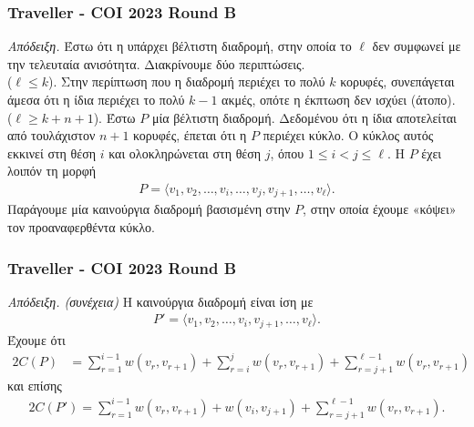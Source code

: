 \documentclass[t]{beamer}
\begin{document}
\begin{frame}
	\frametitle{Traveller - COI 2023 Round B}
	\begin{block}{\emph{Απόδειξη.}}
		Έστω ότι η υπάρχει βέλτιστη διαδρομή, στην οποία το $\ell$ δεν συμφωνεί με την τελευταία ανισότητα. Διακρίνουμε δύο περιπτώσεις.
		\pause
		\\
		\vspace{0.25cm} 		 
		($\ell \leq k$). Στην περίπτωση που η διαδρομή περιέχει το πολύ $k$ κορυφές, συνεπάγεται άμεσα ότι η ίδια περιέχει το πολύ $k - 1$ ακμές, οπότε η έκπτωση δεν ισχύει (άτοπο). 
		\pause
		\\
		\vspace{0.25cm} 	
		($\ell \geq k + n + 1$). Έστω $P$ μία βέλτιστη διαδρομή. Δεδομένου ότι η ίδια αποτελείται από τουλάχιστον $n + 1$ κορυφές, έπεται ότι η $P$ περιέχει κύκλο. Ο κύκλος αυτός εκκινεί στη θέση 
		$i$ και ολοκληρώνεται στη θέση $j$, όπου $1 \leq i < j \leq \ell$. Η $P$ έχει λοιπόν τη μορφή
		\begin{align*}
			P = \langle v_1, v_2, \dots, v_i, \dots, v_j, v_{j + 1}, \dots, v_\ell \rangle.
		\end{align*}
		Παράγουμε μία καινούργια διαδρομή βασισμένη στην $P$, στην οποία έχουμε «κόψει» τον προαναφερθέντα κύκλο.
	\end{block}
\end{frame}

\begin{frame}
	\frametitle{Traveller - COI 2023 Round B}
	\begin{block}{\emph{Απόδειξη. (συνέχεια)}}
		 Η καινούργια διαδρομή είναι ίση με
		\begin{align*}
			P' = \langle v_1, v_2, \dots, v_i, v_{j + 1}, \dots, v_\ell \rangle.
		\end{align*}
		\pause	
		Έχουμε ότι 
		\begin{align*}
			2C(P) &= \sum_{r = 1}^{i - 1}  w(v_r, v_{r + 1}) + \sum_{r = i}^{j} w(v_r, v_{r + 1}) + \sum_{r = j + 1}^{\ell - 1} w(v_r, v_{r + 1})
		\end{align*}
		\pause
		και επίσης
		\begin{align*}
			2C(P') = \sum_{r = 1}^{i - 1}  w(v_r, v_{r + 1}) + w(v_i, v_{j + 1}) + \sum_{r = j + 1}^{\ell - 1} w(v_r, v_{r + 1}).
		\end{align*}
	\end{block}
\end{frame}
\end{document}
